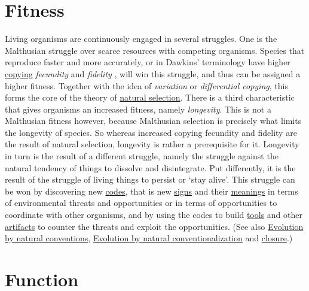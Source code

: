 \documentclass[12pt]{article}
\begin{document}
\section{Fitness}
Living organisms are continuously engaged in several struggles. One is
the Malthusian struggle over scarce resources with competing
organisms. Species that reproduce faster and more accurately, or in
Dawkins' terminology have higher
\hyperlink{copying_and_coding}{copying} {\em fecundity} and {\em
  fidelity} \cite{Dawkins:selfish_gene}, will win this struggle, and
thus can be assigned a higher fitness. Together with the idea of {\em
  variation} or {\em differential copying}, this forms the core of the
theory of \hyperlink{natural_selection}{natural selection}.  There is
a third characteristic that gives organisms an increased fitness,
namely {\em longevity}. This is not a Malthusian fitness however,
because Malthusian selection is precisely what limits the longevity of
species. So whereas increased copying fecundity and fidelity are the
result of natural selection, longevity is rather a prerequisite for
it.  Longevity in turn is the result of a different struggle, namely
the struggle against the natural tendency of things to dissolve and
disintegrate. Put differently, it is the result of the struggle of
living things to persist or `stay alive'. This struggle can be won by
discovering new \hyperlink{copying_and_coding}{codes}, that is new
\hyperlink{signs}{signs} and their \hyperlink{meaning}{meanings} in
terms of environmental threats and opportunities or in terms of
opportunities to coordinate with other organisms, and by using the
codes to build \hyperlink{tools}{tools} and other
\hyperlink{artifacts}{artifacts} to counter the threats and exploit
the opportunities. (See also \hyperlink{natural_conventions}{Evolution
  by natural conventions},
\hyperlink{natural_conventionalization}{Evolution by natural
  conventionalization} and \hyperlink{closure}{closure}.)

\hypertarget{function}{}
\section{Function}
\end{document}
